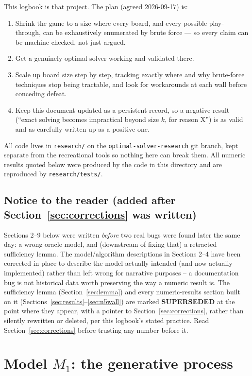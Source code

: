 \documentclass[11pt]{article}
\begin{document}
This logbook is that project. The plan (agreed 2026-09-17) is:
\begin{enumerate}
  \item Shrink the game to a size where every board, and every possible
  play-through, can be exhaustively enumerated by brute force --- so every
  claim can be machine-checked, not just argued.
  \item Get a genuinely optimal solver working and validated there.
  \item Scale up board size step by step, tracking exactly where and why
  brute-force techniques stop being tractable, and look for workarounds at
  each wall before conceding defeat.
  \item Keep this document updated as a persistent record, so a negative
  result (``exact solving becomes impractical beyond size $k$, for reason
  X'') is as valid and as carefully written up as a positive one.
\end{enumerate}

All code lives in \texttt{research/} on the \texttt{optimal-solver-research}
git branch, kept separate from the recreational tools so nothing here can
break them. All numeric results quoted below were produced by the code in
this directory and are reproduced by \texttt{research/tests/}.

\subsection*{Notice to the reader (added after Section~\ref{sec:corrections}
was written)}

Sections 2--9 below were written \emph{before} two real bugs were found
later the same day: a wrong oracle model, and (downstream of fixing that)
a retracted sufficiency lemma. The model/algorithm descriptions in
Sections 2--4 have been corrected in place to describe the model actually
intended (and now actually implemented) rather than left wrong for
narrative purposes -- a documentation bug is not historical data worth
preserving the way a numeric result is. The sufficiency lemma
(Section~\ref{sec:lemma}) and every numeric-results section built on it
(Sections~\ref{sec:results}--\ref{sec:n5wall}) are marked
\textbf{SUPERSEDED} at the point where they appear, with a pointer to
Section~\ref{sec:corrections}, rather than silently rewritten or deleted,
per this logbook's stated practice. Read Section~\ref{sec:corrections}
before trusting any number before it.

\section{Model $M_1$: the generative process}
\end{document}
